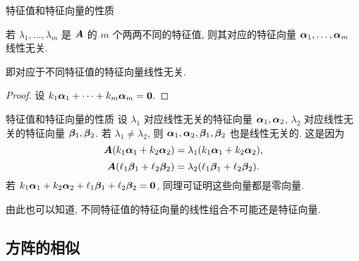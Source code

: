 \begin{frame}{特征值和特征向量的性质}
\beqskip{0pt}
	\onslide<+->
	\begin{theorem}
		若 $\lambda_1,\dots,\lambda_m$ 是 ${\boldsymbol{A}}$ 的 $m$ 个两两不同的特征值, 则其对应的特征向量 ${\boldsymbol{\alpha}}_1,\dots,{\boldsymbol{\alpha}}_m$ 线性无关.
	\end{theorem}
	\onslide<+->
	即\alert{对应于不同特征值的特征向量线性无关}.
	\onslide<+->
	\begin{proof}
		设 $k_1{\boldsymbol{\alpha}}_1+\cdots+k_m{\boldsymbol{\alpha}}_m={\bf0}$.
		\onslide<+->{%
			从而
			\[(k_1\bma_1,\cdots,k_m\bma_m)=\bfO,\qquad
			k_1=\cdots=k_m=0.\qedhere\]
		}
		\vspace{-\baselineskip}
	\end{proof}
\endgroup
\end{frame}


\begin{frame}{特征值和特征向量的性质}
	\onslide<+->
	设 $\lambda_1$ 对应线性无关的特征向量 ${\boldsymbol{\alpha}}_1,{\boldsymbol{\alpha}}_2$,
	$\lambda_2$ 对应线性无关的特征向量 ${\boldsymbol{\beta}}_1,{\boldsymbol{\beta}}_2$.
	\onslide<+->
	若 $\lambda_1\neq \lambda_2$, 则 ${\boldsymbol{\alpha}}_1,{\boldsymbol{\alpha}}_2,{\boldsymbol{\beta}}_1,{\boldsymbol{\beta}}_2$ 也是线性无关的.
	\onslide<+->
	这是因为
	\[{\boldsymbol{A}}(k_1{\boldsymbol{\alpha}}_1+k_2{\boldsymbol{\alpha}}_2)=\lambda_1(k_1{\boldsymbol{\alpha}}_1+k_2{\boldsymbol{\alpha}}_2),\]
	\[{\boldsymbol{A}}(\ell_1{\boldsymbol{\beta}}_1+\ell_2{\boldsymbol{\beta}}_2)=\lambda_2(\ell_1{\boldsymbol{\beta}}_1+\ell_2{\boldsymbol{\beta}}_2).\]
	\onslide<+->
	若 $k_1{\boldsymbol{\alpha}}_1+k_2{\boldsymbol{\alpha}}_2+\ell_1{\boldsymbol{\beta}}_1+\ell_2{\boldsymbol{\beta}}_2={\bf0}$,
	同理可证明这些向量都是零向量.
	
	\onslide<+->
	由此也可以知道, 不同特征值的特征向量的线性组合不可能还是特征向量.
\end{frame}


\subsection{方阵的相似}

